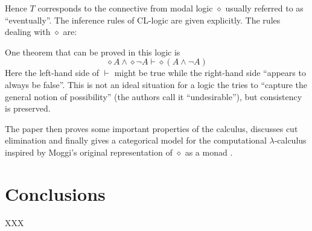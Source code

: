 \documentclass[12pt,toc=bibliography,numbers=noendperiod,
               footnotes=multiple,twoside]{scrartcl}
\begin{document}
Hence \(T\) corresponds to the connective from modal logic \(\diamond\) usually referred to as \enquote{eventually}. The inference rules of CL-logic are given explicitly. The rules dealing with \(\diamond\) are:

\begin{figure}[h]
\begin{minipage}[b]{1\linewidth}
\centering
\begin{minipage}[b]{0.45\linewidth}
\begin{prooftree}
\end{prooftree}
\end{minipage}
\begin{minipage}[b]{0.35\linewidth}
\begin{prooftree}
\end{prooftree}
\end{minipage}
\end{minipage}
\end{figure}

One theorem that can be proved in this logic is \[\diamond A \wedge \diamond \neg A \vdash \diamond (A \wedge \neg A)\] Here the left-hand side of \(\vdash\) might be true while the right-hand side \enquote{appears to always be false}. This is not an ideal situation for a logic the tries to \enquote{capture the general notion of possibility} (the authors call it \enquote{undesirable}), but consistency is preserved.

The paper then proves some important properties of the calculus, discusses cut elimination and finally gives a categorical model for the computational \(\lambda\)-calculus inspired by Moggi's original representation of \(\diamond\) as a monad \autocite{moggi_notions_1991}.

\section{Conclusions}

XXX

\printbibliography
\end{document}
